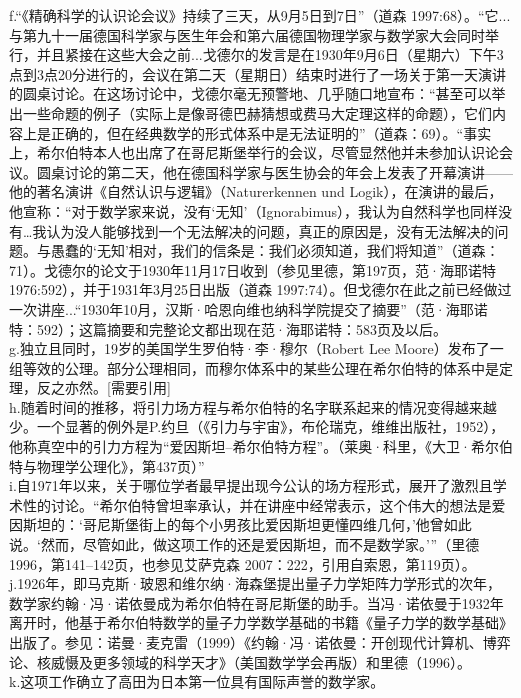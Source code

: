 f.“《精确科学的认识论会议》持续了三天，从9月5日到7日”（道森 1997:68）。“它...与第九十一届德国科学家与医生年会和第六届德国物理学家与数学家大会同时举行，并且紧接在这些大会之前...戈德尔的发言是在1930年9月6日（星期六）下午3点到3点20分进行的，会议在第二天（星期日）结束时进行了一场关于第一天演讲的圆桌讨论。在这场讨论中，戈德尔毫无预警地、几乎随口地宣布：“甚至可以举出一些命题的例子（实际上是像哥德巴赫猜想或费马大定理这样的命题），它们内容上是正确的，但在经典数学的形式体系中是无法证明的”（道森：69）。“事实上，希尔伯特本人也出席了在哥尼斯堡举行的会议，尽管显然他并未参加认识论会议。圆桌讨论的第二天，他在德国科学家与医生协会的年会上发表了开幕演讲——他的著名演讲《自然认识与逻辑》（Naturerkennen und Logik），在演讲的最后，他宣称：“对于数学家来说，没有‘无知’（Ignorabimus），我认为自然科学也同样没有…我认为没人能够找到一个无法解决的问题，真正的原因是，没有无法解决的问题。与愚蠢的‘无知’相对，我们的信条是：我们必须知道，我们将知道”（道森：71）。戈德尔的论文于1930年11月17日收到（参见里德，第197页，范·海耶诺特 1976:592），并于1931年3月25日出版（道森 1997:74）。但戈德尔在此之前已经做过一次讲座...“1930年10月，汉斯·哈恩向维也纳科学院提交了摘要”（范·海耶诺特：592）；这篇摘要和完整论文都出现在范·海耶诺特：583页及以后。\\
g.独立且同时，19岁的美国学生罗伯特·李·穆尔（Robert Lee Moore）发布了一组等效的公理。部分公理相同，而穆尔体系中的某些公理在希尔伯特的体系中是定理，反之亦然。[需要引用]\\
h.随着时间的推移，将引力场方程与希尔伯特的名字联系起来的情况变得越来越少。一个显著的例外是P.约旦（《引力与宇宙》，布伦瑞克，维维出版社，1952），他称真空中的引力方程为“爱因斯坦–希尔伯特方程”。（莱奥·科里，《大卫·希尔伯特与物理学公理化》，第437页）”\\
i.自1971年以来，关于哪位学者最早提出现今公认的场方程形式，展开了激烈且学术性的讨论。“希尔伯特曾坦率承认，并在讲座中经常表示，这个伟大的想法是爱因斯坦的：‘哥尼斯堡街上的每个小男孩比爱因斯坦更懂四维几何，’他曾如此说。‘然而，尽管如此，做这项工作的还是爱因斯坦，而不是数学家。’”（里德 1996，第141–142页，也参见艾萨克森 2007：222，引用自索恩，第119页）。\\
j.1926年，即马克斯·玻恩和维尔纳·海森堡提出量子力学矩阵力学形式的次年，数学家约翰·冯·诺依曼成为希尔伯特在哥尼斯堡的助手。当冯·诺依曼于1932年离开时，他基于希尔伯特数学的量子力学数学基础的书籍《量子力学的数学基础》出版了。参见：诺曼·麦克雷（1999）《约翰·冯·诺依曼：开创现代计算机、博弈论、核威慑及更多领域的科学天才》（美国数学学会再版）和里德（1996）。\\
k.这项工作确立了高田为日本第一位具有国际声誉的数学家。\\
